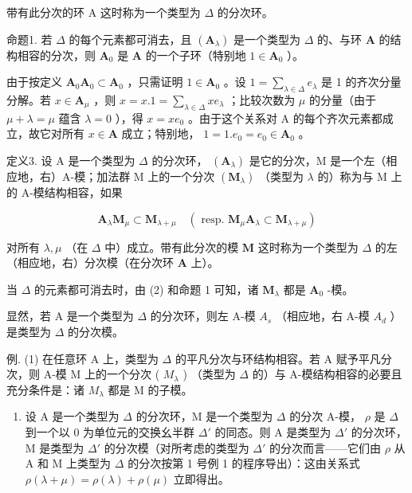 带有此分次的环 A 这时称为一个类型为 \(\Delta\) 的分次环。

命题1. 若 \(\Delta\) 的每个元素都可消去，且 \((\mathbf{A}_{\lambda})\) 是一个类型为 \(\Delta\) 的、与环 \(\mathbf{A}\) 的结构相容的分次，则 \(\mathbf{A}_0\) 是 \(\mathbf{A}\) 的一个子环（特别地 \(1 \in \mathbf{A}_0\) ）。

由于按定义 \(\mathbf{A}_0\mathbf{A}_0\subset \mathbf{A}_0\) ，只需证明 \(1\in \mathbf{A}_0\) 。设 \(1 = \sum_{\lambda \in \Delta}e_{\lambda}\) 是 1 的齐次分量分解。若 \(x\in \mathbf{A}_{\mu}\) ，则 \(x = x.1 = \sum_{\lambda \in \Delta}xe_{\lambda}\) ；比较次数为 \(\mu\) 的分量（由于 \(\mu +\lambda = \mu\) 蕴含 \(\lambda = 0\) ），得 \(x = xe_0\) 。由于这个关系对 A 的每个齐次元素都成立，故它对所有 \(x\in \mathbf{A}\) 成立；特别地， \(1 = 1.e_0 = e_0\in \mathbf{A}_0\) 。

定义3. 设 A 是一个类型为 \(\Delta\) 的分次环， \((\mathbf{A}_{\lambda})\) 是它的分次，M 是一个左（相应地，右）A-模；加法群 M 上的一个分次 \((\mathbf{M}_{\lambda})\) （类型为 \(\lambda\) 的）称为与 M 上的 A-模结构相容，如果

\[
\mathbf {A} _ {\lambda} \mathbf {M} _ {\mu} \subset \mathbf {M} _ {\lambda + \mu} \quad (\text { resp. } \mathbf {M} _ {\mu} \mathbf {A} _ {\lambda} \subset \mathbf {M} _ {\lambda + \mu})\tag{2}
\]

对所有 \(\lambda, \mu\) （在 \(\Delta\) 中）成立。带有此分次的模 \(\mathbf{M}\) 这时称为一个类型为 \(\Delta\) 的左（相应地，右）分次模（在分次环 \(\mathbf{A}\) 上）。

当 \(\Delta\) 的元素都可消去时，由 (2) 和命题 1 可知，诸 \(\mathbf{M}_{\lambda}\) 都是 \(\mathbf{A}_0\) -模。

显然，若 A 是一个类型为 \(\Delta\) 的分次环，则左 A-模 \(A_{s}\) （相应地，右 A-模 \(A_{d}\) ）是类型为 \(\Delta\) 的分次模。

例. (1) 在任意环 A 上，类型为 \(\Delta\) 的平凡分次与环结构相容。若 A 赋予平凡分次，则 A-模 M 上的一个分次 ( \(M_{\lambda}\) ) （类型为 \(\Delta\) 的）与 A-模结构相容的必要且充分条件是：诸 \(M_{\lambda}\) 都是 M 的子模。

\begin{enumerate}
\def\labelenumi{(\arabic{enumi})}
\setcounter{enumi}{1}
\tightlist
\item
  设 A 是一个类型为 \(\Delta\) 的分次环，M 是一个类型为 \(\Delta\) 的分次 A-模， \(\rho\) 是 \(\Delta\) 到一个以 0 为单位元的交换幺半群 \(\Delta'\) 的同态。则 A 是类型为 \(\Delta'\) 的分次环，M 是类型为 \(\Delta'\) 的分次模（对所考虑的类型为 \(\Delta'\) 的分次而言——它们由 \(\rho\) 从 A 和 M 上类型为 \(\Delta\) 的分次按第 1 号例 1 的程序导出）：这由关系式 \(\rho(\lambda + \mu) = \rho(\lambda) + \rho(\mu)\) 立即得出。
\end{enumerate}

